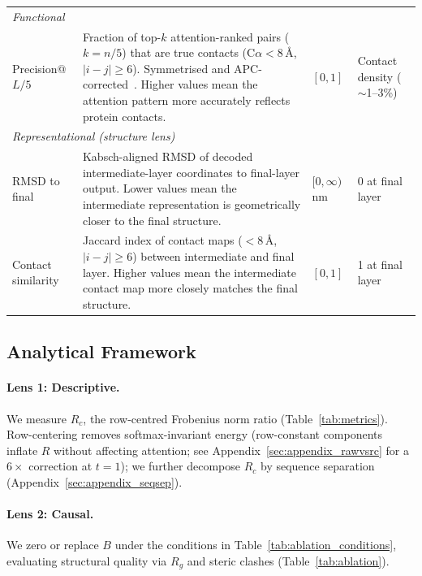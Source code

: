 \documentclass{article}
\begin{document}
\begin{table}[h]
\begin{tabular}{p{2.5cm}p{7.2cm}p{1.6cm}p{2.2cm}}
        \midrule
        \multicolumn{4}{l}{\emph{Functional}} \\[2pt]
        Precision@$L/5$ & Fraction of top-$k$ attention-ranked pairs ($k{=}n/5$) that are true contacts (C$\alpha < 8$\,\AA, $|i{-}j| \geq 6$). Symmetrised and APC-corrected~\citep{rao2020transformer}. Higher values mean the attention pattern more accurately reflects protein contacts. & $[0, 1]$ & Contact density ($\sim$1--3\%) \\[4pt]
        \midrule
        \multicolumn{4}{l}{\emph{Representational (structure lens)}} \\[2pt]
        RMSD to final & Kabsch-aligned RMSD of decoded intermediate-layer coordinates to final-layer output. Lower values mean the intermediate representation is geometrically closer to the final structure. & $[0, \infty)$ nm & 0 at final layer \\[4pt]
        Contact similarity & Jaccard index of contact maps ($< 8$\,\AA, $|i{-}j| \geq 6$) between intermediate and final layer. Higher values mean the intermediate contact map more closely matches the final structure. & $[0, 1]$ & 1 at final layer \\
        \bottomrule
    \end{tabular}
\end{table}

\subsection{Analytical Framework}

\paragraph{Lens 1: Descriptive.}
We measure $R_c$, the row-centred Frobenius norm ratio (Table~\ref{tab:metrics}).
Row-centering removes softmax-invariant energy (row-constant components inflate $R$ without affecting attention; see Appendix~\ref{sec:appendix_rawvsrc} for a $6\times$ correction at $t{=}1$); we further decompose $R_c$ by sequence separation (Appendix~\ref{sec:appendix_seqsep}).

\paragraph{Lens 2: Causal.}
We zero or replace $B$ under the conditions in Table~\ref{tab:ablation_conditions}, evaluating structural quality via $R_g$ and steric clashes (Table~\ref{tab:ablation}).
\end{document}
